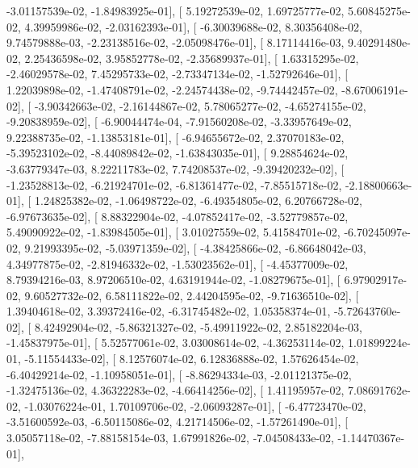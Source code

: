 \documentclass{article}
\begin{document}
         -3.01157539e-02,  -1.84983925e-01],
       [  5.19272539e-02,   1.69725777e-02,   5.60845275e-02,
          4.39959986e-02,  -2.03162393e-01],
       [ -6.30039688e-02,   8.30356408e-02,   9.74579888e-03,
         -2.23138516e-02,  -2.05098476e-01],
       [  8.17114416e-03,   9.40291480e-02,   2.25436598e-02,
          3.95852778e-02,  -2.35689937e-01],
       [  1.63315295e-02,  -2.46029578e-02,   7.45295733e-02,
         -2.73347134e-02,  -1.52792646e-01],
       [  1.22039898e-02,  -1.47408791e-02,  -2.24574438e-02,
         -9.74442457e-02,  -8.67006191e-02],
       [ -3.90342663e-02,  -2.16144867e-02,   5.78065277e-02,
         -4.65274155e-02,  -9.20838959e-02],
       [ -6.90044474e-04,  -7.91560208e-02,  -3.33957649e-02,
          9.22388735e-02,  -1.13853181e-01],
       [ -6.94655672e-02,   2.37070183e-02,  -5.39523102e-02,
         -8.44089842e-02,  -1.63843035e-01],
       [  9.28854624e-02,  -3.63779347e-03,   8.22211783e-02,
          7.74208537e-02,  -9.39420232e-02],
       [ -1.23528813e-02,  -6.21924701e-02,  -6.81361477e-02,
         -7.85515718e-02,  -2.18800663e-01],
       [  1.24825382e-02,  -1.06498722e-02,  -6.49354805e-02,
          6.20766728e-02,  -6.97673635e-02],
       [  8.88322904e-02,  -4.07852417e-02,  -3.52779857e-02,
          5.49090922e-02,  -1.83984505e-01],
       [  3.01027559e-02,   5.41584701e-02,  -6.70245097e-02,
          9.21993395e-02,  -5.03971359e-02],
       [ -4.38425866e-02,  -6.86648042e-03,   4.34977875e-02,
         -2.81946332e-02,  -1.53023562e-01],
       [ -4.45377009e-02,   8.79394216e-03,   8.97206510e-02,
          4.63191944e-02,  -1.08279675e-01],
       [  6.97902917e-02,   9.60527732e-02,   6.58111822e-02,
          2.44204595e-02,  -9.71636510e-02],
       [  1.39404618e-02,   3.39372416e-02,  -6.31745482e-02,
          1.05358374e-01,  -5.72643760e-02],
       [  8.42492904e-02,  -5.86321327e-02,  -5.49911922e-02,
          2.85182204e-03,  -1.45837975e-01],
       [  5.52577061e-02,   3.03008614e-02,  -4.36253114e-02,
          1.01899224e-01,  -5.11554433e-02],
       [  8.12576074e-02,   6.12836888e-02,   1.57626454e-02,
         -6.40429214e-02,  -1.10958051e-01],
       [ -8.86294334e-03,  -2.01121375e-02,  -1.32475136e-02,
          4.36322283e-02,  -4.66414256e-02],
       [  1.41195957e-02,   7.08691762e-02,  -1.03076224e-01,
          1.70109706e-02,  -2.06093287e-01],
       [ -6.47723470e-02,  -3.51600592e-03,  -6.50115086e-02,
          4.21714506e-02,  -1.57261490e-01],
       [  3.05057118e-02,  -7.88158154e-03,   1.67991826e-02,
         -7.04508433e-02,  -1.14470367e-01],
\end{document}
